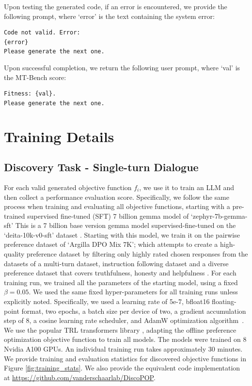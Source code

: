 \documentclass{article}
\theoremstyle{plain}
\theoremstyle{definition}
\theoremstyle{remark}
\begin{document}
Upon testing the generated code, if an error is encountered, we provide the following prompt, where `error' is the text containing the system error:

\begin{lstlisting}
Code not valid. Error:
{error}
Please generate the next one.
\end{lstlisting}

Upon successful completion, we return the following user prompt, where `val' is the MT-Bench score:

\begin{lstlisting}
Fitness: {val}.
Please generate the next one.
\end{lstlisting}

\section{Training Details}
\label{sec:meta-training-details}

\subsection{Discovery Task - Single-turn Dialogue}
\label{subsec:single-turn-training}
For each valid generated objective function $f_i$, we use it to train an LLM and then collect a performance evaluation score. Specifically, we follow the same process when training and evaluating all objective functions, starting with a pre-trained supervised fine-tuned (SFT) 7 billion gemma model of `zephyr-7b-gemma-sft'
This is a 7 billion base version gemma \citep{team2024gemma} model supervised-fine-tuned on the `deita-10k-v0-sft' dataset \citep{liu2023makes}. Starting with this model, we train it on the pairwise preference dataset of `Argilla DPO Mix 7K'; which attempts to create a high-quality preference dataset by filtering only highly rated chosen responses from the datasets of a multi-turn dataset, instruction following dataset \citep{longpre2023flan} and a diverse preference dataset that covers truthfulness, honesty and helpfulness \citep{cui2023ultrafeedback}. For each training run, we trained all the parameters of the starting model, using a fixed $\beta=0.05$. We used the same fixed hyper-parameters for all training runs unless explicitly noted. Specifically, we used a learning rate of 5e-7, bfloat16 floating-point format, two epochs, a batch size per device of two, a gradient accumulation step of 8, a cosine learning rate scheduler, and AdamW optimization algorithm~\citep{adamw}. We use the popular TRL transformers library \citep{von_Werra_TRL_Transformer_Reinforcement}, adapting the offline preference optimization objective function to train all models. The models were trained on 8 Nvidia A100 GPUs. An individual training run takes approximately 30 minutes. We provide training and evaluation statistics for discovered objective functions in Figure \ref{fig:training_stats}. We also provide the equivalent code implementation at \url{https://github.com/vanderschaarlab/DiscoPOP}.
\end{document}
